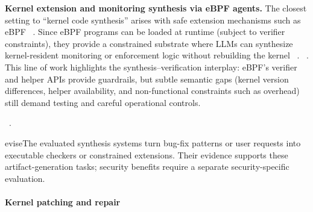 \textbf{Kernel extension and monitoring synthesis via eBPF agents.}
The closest setting to ``kernel code synthesis'' arises with safe extension mechanisms such as eBPF ~\cite{zheng2024kgent}. Since eBPF programs can be loaded at runtime (subject to verifier constraints), they provide a constrained substrate where LLMs can synthesize kernel-resident monitoring or enforcement logic without rebuilding the kernel ~\cite{gao2025offloading}.
~.
This line of work highlights the synthesis--verification interplay: eBPF's verifier and helper APIs provide guardrails, but subtle semantic gaps (kernel version differences, helper availability, and non-functional constraints such as overhead) still demand testing and careful operational controls.

~.



\begin{tcolorbox}[colback=gray!8, colframe=gray!55, boxrule=0.4pt, left=1mm, right=1mm, top=0.8mm, bottom=0.8mm, title=Key findings] 

evise{The evaluated synthesis systems turn bug-fix patterns or user requests into executable checkers or constrained extensions. Their evidence supports these artifact-generation tasks; security benefits require a separate security-specific evaluation.}
\end{tcolorbox}

\paragraph{Kernel patching and repair}



